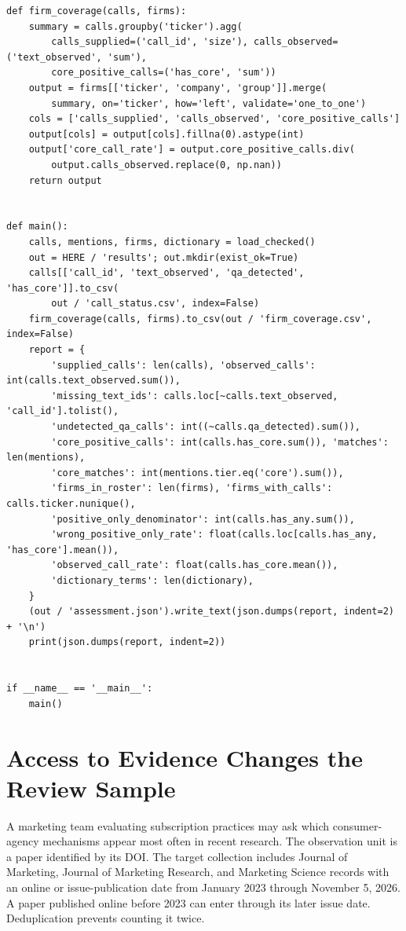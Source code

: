 \begin{Verbatim}[breaklines,breakanywhere,fontsize=\small]
def firm_coverage(calls, firms):
    summary = calls.groupby('ticker').agg(
        calls_supplied=('call_id', 'size'), calls_observed=('text_observed', 'sum'),
        core_positive_calls=('has_core', 'sum'))
    output = firms[['ticker', 'company', 'group']].merge(
        summary, on='ticker', how='left', validate='one_to_one')
    cols = ['calls_supplied', 'calls_observed', 'core_positive_calls']
    output[cols] = output[cols].fillna(0).astype(int)
    output['core_call_rate'] = output.core_positive_calls.div(
        output.calls_observed.replace(0, np.nan))
    return output


def main():
    calls, mentions, firms, dictionary = load_checked()
    out = HERE / 'results'; out.mkdir(exist_ok=True)
    calls[['call_id', 'text_observed', 'qa_detected', 'has_core']].to_csv(
        out / 'call_status.csv', index=False)
    firm_coverage(calls, firms).to_csv(out / 'firm_coverage.csv', index=False)
    report = {
        'supplied_calls': len(calls), 'observed_calls': int(calls.text_observed.sum()),
        'missing_text_ids': calls.loc[~calls.text_observed, 'call_id'].tolist(),
        'undetected_qa_calls': int((~calls.qa_detected).sum()),
        'core_positive_calls': int(calls.has_core.sum()), 'matches': len(mentions),
        'core_matches': int(mentions.tier.eq('core').sum()),
        'firms_in_roster': len(firms), 'firms_with_calls': calls.ticker.nunique(),
        'positive_only_denominator': int(calls.has_any.sum()),
        'wrong_positive_only_rate': float(calls.loc[calls.has_any, 'has_core'].mean()),
        'observed_call_rate': float(calls.has_core.mean()),
        'dictionary_terms': len(dictionary),
    }
    (out / 'assessment.json').write_text(json.dumps(report, indent=2) + '\n')
    print(json.dumps(report, indent=2))


if __name__ == '__main__':
    main()
\end{Verbatim}

\hypertarget{M02-access-to-evidence-changes-the-review-sample}{%
\section{Access to Evidence Changes the Review
Sample}\label{M02-access-to-evidence-changes-the-review-sample}}

\noindent \noindent A marketing team evaluating subscription practices may ask
which consumer-agency mechanisms appear most often in recent research.
The observation unit is a paper identified by its DOI. The target
collection includes Journal of Marketing, Journal of Marketing Research,
and Marketing Science records with an online or issue-publication date
from January 2023 through November 5, 2026. A paper published online
before 2023 can enter through its later issue date. Deduplication
prevents counting it twice.

